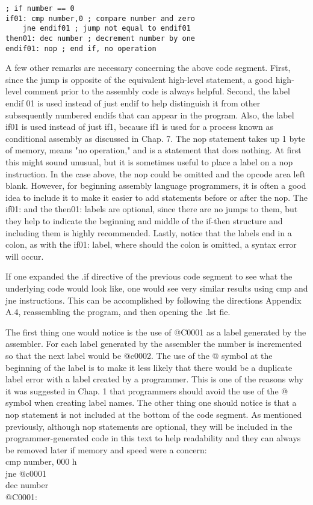 \documentclass[10pt]{article}
\begin{document}
\begin{verbatim}
; if number == 0
if01: cmp number,0 ; compare number and zero
    jne endif01 ; jump not equal to endif01
then01: dec number ; decrement number by one
endif01: nop ; end if, no operation
\end{verbatim}

A few other remarks are necessary concerning the above code segment. First, since the jump is opposite of the equivalent high-level statement, a good high-level comment prior to the assembly code is always helpful. Second, the label endif 01 is used instead of just endif to help distinguish it from other subsequently numbered endifs that can appear in the program. Also, the label if01 is used instead of just if1, because if1 is used for a process known as conditional assembly as discussed in Chap. 7. The nop statement takes up 1 byte of memory, means "no operation," and is a statement that does nothing. At first this might sound unusual, but it is sometimes useful to place a label on a nop instruction. In the case above, the nop could be omitted and the opcode area left blank. However, for beginning assembly language programmers, it is often a good idea to include it to make it easier to add statements before or after the nop. The if01: and the then01: labels are optional, since there are no jumps to them, but they help to indicate the beginning and middle of the if-then structure and including them is highly recommended. Lastly, notice that the labels end in a colon, as with the if01: label, where should the colon is omitted, a syntax error will occur.

If one expanded the .if directive of the previous code segment to see what the underlying code would look like, one would see very similar results using cmp and jne instructions. This can be accomplished by following the directions Appendix A.4, reassembling the program, and then opening the .lst fie.

The first thing one would notice is the use of @C0001 as a label generated by the assembler. For each label generated by the assembler the number is incremented so that the next label would be @c0002. The use of the @ symbol at the beginning of the label is to make it less likely that there would be a duplicate label error with a label created by a programmer. This is one of the reasons why it was suggested in Chap. 1 that programmers should avoid the use of the @ symbol when creating label names. The other thing one should notice is that a nop statement is not included at the bottom of the code segment. As mentioned previously, although nop statements are optional, they will be included in the programmer-generated code in this text to help readability and they can always be removed later if memory and speed were a concern:\\
cmp number, 000 h\\
jne @c0001\\
dec number\\
@C0001:
\end{document}
